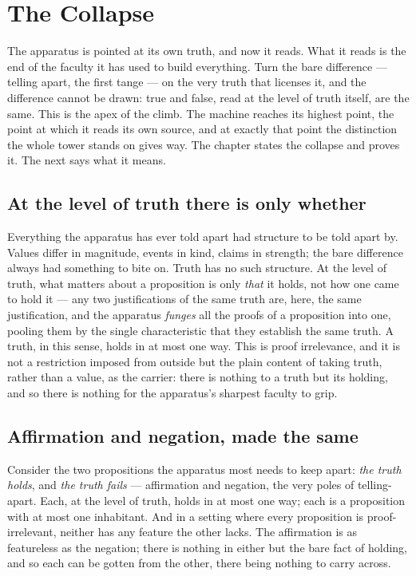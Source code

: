 \chapter{The Collapse}
\label{chap:the-collapse}

The apparatus is pointed at its own truth, and now it reads. What it reads is the end of the faculty it
has used to build everything. Turn the bare difference --- telling apart, the first tange --- on the very
truth that licenses it, and the difference cannot be drawn: true and false, read at the level of truth
itself, are the same. This is the apex of the climb. The machine reaches its highest point, the point at
which it reads its own source, and at exactly that point the distinction the whole tower stands on gives
way. The chapter states the collapse and proves it. The next says what it means.

\section{At the level of truth there is only whether}
\label{se:only-whether}

Everything the apparatus has ever told apart had structure to be told apart by. Values differ in magnitude,
events in kind, claims in strength; the bare difference always had something to bite on. Truth has no such
structure. At the level of truth, what matters about a proposition is only \emph{that} it holds, not how
one came to hold it --- any two justifications of the same truth are, here, the same justification, and the
apparatus \emph{funges} all the proofs of a proposition into one, pooling them by the single characteristic
that they establish the same truth. A truth, in this sense, holds in at most one way. This is proof
irrelevance, and it is not a restriction imposed from outside but the plain content of taking truth, rather
than a value, as the carrier: there is nothing to a truth but its holding, and so there is nothing for the
apparatus's sharpest faculty to grip.

\section{Affirmation and negation, made the same}
\label{se:affirmation-negation-same}

Consider the two propositions the apparatus most needs to keep apart: \emph{the truth holds}, and
\emph{the truth fails} --- affirmation and negation, the very poles of telling-apart. Each, at the level of
truth, holds in at most one way; each is a proposition with at most one inhabitant. And in a setting where
every proposition is proof-irrelevant, neither has any feature the other lacks. The affirmation is as
featureless as the negation; there is nothing in either but the bare fact of holding, and so each can be
gotten from the other, there being nothing to carry across.

